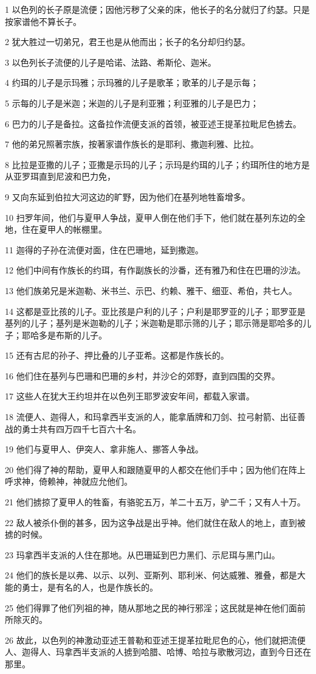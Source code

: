 \par 1 以色列的长子原是流便；因他污秽了父亲的床，他长子的名分就归了约瑟。只是按家谱他不算长子。
\par 2 犹大胜过一切弟兄，君王也是从他而出；长子的名分却归约瑟。
\par 3 以色列长子流便的儿子是哈诺、法路、希斯伦、迦米。
\par 4 约珥的儿子是示玛雅；示玛雅的儿子是歌革；歌革的儿子是示每；
\par 5 示每的儿子是米迦；米迦的儿子是利亚雅；利亚雅的儿子是巴力；
\par 6 巴力的儿子是备拉。这备拉作流便支派的首领，被亚述王提革拉毗尼色掳去。
\par 7 他的弟兄照著宗族，按著家谱作族长的是耶利、撒迦利雅、比拉。
\par 8 比拉是亚撒的儿子；亚撒是示玛的儿子；示玛是约珥的儿子；约珥所住的地方是从亚罗珥直到尼波和巴力免，
\par 9 又向东延到伯拉大河这边的旷野，因为他们在基列地牲畜增多。
\par 10 扫罗年间，他们与夏甲人争战，夏甲人倒在他们手下，他们就在基列东边的全地，住在夏甲人的帐棚里。
\par 11 迦得的子孙在流便对面，住在巴珊地，延到撒迦。
\par 12 他们中间有作族长的约珥，有作副族长的沙番，还有雅乃和住在巴珊的沙法。
\par 13 他们族弟兄是米迦勒、米书兰、示巴、约赖、雅干、细亚、希伯，共七人。
\par 14 这都是亚比孩的儿子。亚比孩是户利的儿子；户利是耶罗亚的儿子；耶罗亚是基列的儿子；基列是米迦勒的儿子；米迦勒是耶示筛的儿子；耶示筛是耶哈多的儿子；耶哈多是布斯的儿子。
\par 15 还有古尼的孙子、押比叠的儿子亚希。这都是作族长的。
\par 16 他们住在基列与巴珊和巴珊的乡村，并沙仑的郊野，直到四围的交界。
\par 17 这些人在犹大王约坦并在以色列王耶罗波安年间，都载入家谱。
\par 18 流便人、迦得人，和玛拿西半支派的人，能拿盾牌和刀剑、拉弓射箭、出征善战的勇士共有四万四千七百六十名。
\par 19 他们与夏甲人、伊突人、拿非施人、挪答人争战。
\par 20 他们得了神的帮助，夏甲人和跟随夏甲的人都交在他们手中；因为他们在阵上呼求神，倚赖神，神就应允他们。
\par 21 他们掳掠了夏甲人的牲畜，有骆驼五万，羊二十五万，驴二千；又有人十万。
\par 22 敌人被杀仆倒的甚多，因为这争战是出乎神。他们就住在敌人的地上，直到被掳的时候。
\par 23 玛拿西半支派的人住在那地。从巴珊延到巴力黑们、示尼珥与黑门山。
\par 24 他们的族长是以弗、以示、以列、亚斯列、耶利米、何达威雅、雅叠，都是大能的勇士，是有名的人，也是作族长的。
\par 25 他们得罪了他们列祖的神，随从那地之民的神行邪淫；这民就是神在他们面前所除灭的。
\par 26 故此，以色列的神激动亚述王普勒和亚述王提革拉毗尼色的心，他们就把流便人、迦得人、玛拿西半支派的人掳到哈腊、哈博、哈拉与歌散河边，直到今日还在那里。

